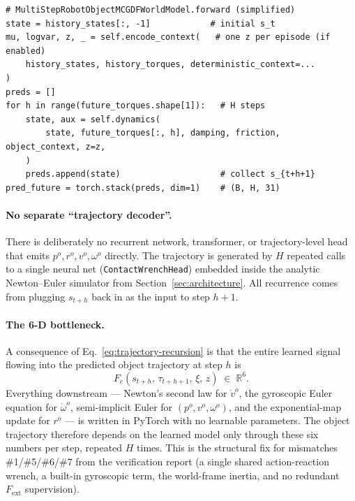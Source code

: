 \documentclass[11pt]{article}
\begin{document}
\begin{lstlisting}
# MultiStepRobotObjectMCGDFWorldModel.forward (simplified)
state = history_states[:, -1]            # initial s_t
mu, logvar, z, _ = self.encode_context(   # one z per episode (if enabled)
    history_states, history_torques, deterministic_context=...
)
preds = []
for h in range(future_torques.shape[1]):   # H steps
    state, aux = self.dynamics(
        state, future_torques[:, h], damping, friction, object_context, z=z,
    )
    preds.append(state)                    # collect s_{t+h+1}
pred_future = torch.stack(preds, dim=1)    # (B, H, 31)
\end{lstlisting}

\paragraph{No separate ``trajectory decoder''.}
There is deliberately no recurrent network, transformer, or
trajectory-level head that emits $p^o, r^o, v^o, \omega^o$ directly. The
trajectory is generated by $H$ repeated calls to a single neural net
(\texttt{ContactWrenchHead}) embedded inside the analytic Newton--Euler
simulator from Section~\ref{sec:architecture}. All recurrence comes from
plugging $s_{t+h}$ back in as the input to step $h+1$.

\paragraph{The 6-D bottleneck.}
A consequence of Eq.~\eqref{eq:trajectory-recursion} is that the entire
learned signal flowing into the predicted object trajectory at step
$h$ is
\begin{equation}
  F_c(s_{t+h},\,\tau_{t+h+1},\,\xi,\,z) \;\in\; \mathbb{R}^6.
  \label{eq:six-d-bottleneck}
\end{equation}
Everything downstream — Newton's second law for $\dot v^o$, the gyroscopic
Euler equation for $\dot\omega^o$, semi-implicit Euler for
$(p^o, v^o, \omega^o)$, and the exponential-map update for $r^o$ — is
written in PyTorch with no learnable parameters. The object trajectory
therefore depends on the learned model only through these six numbers per
step, repeated $H$ times. This is the structural fix for mismatches
\#1/\#5/\#6/\#7 from the verification report (a single shared
action-reaction wrench, a built-in gyroscopic term, the world-frame
inertia, and no redundant $F_{\mathrm{ext}}$ supervision).
\end{document}
